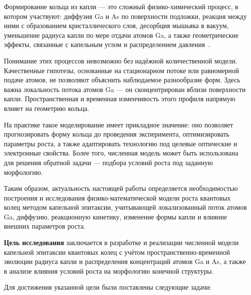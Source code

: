\documentclass[14pt,oneside]{extarticle}
\begin{document}
Формирование кольца из капли — это сложный физико-химический процесс, в котором участвуют: диффузия Ga и As по поверхности подложки, реакция между ними с образованием кристаллического слоя, десорбция мышьяка в вакуум, уменьшение радиуса капли по мере отдачи атомов Ga, а также геометрические эффекты, связанные с капельным углом и распределением давления~\cite{Li2009, 2008GrowthMechanisms}.

Понимание этих процессов невозможно без надёжной количественной модели. Качественные гипотезы, основанные на стационарном потоке или равномерной подаче атомов, не позволяют объяснить наблюдаемое разнообразие форм. Здесь важна локальность потока атомов Ga — он сконцентрирован вблизи поверхности капли. Пространственная и временная изменчивость этого профиля напрямую влияет на геометрию кольца.

На практике такое моделирование имеет прикладное значение: оно позволяет прогнозировать форму кольца до проведения эксперимента, оптимизировать параметры роста, а также адаптировать технологию под целевые оптические и электронные свойства. Более того, численная модель может быть использована для решения обратной задачи — подбора условий роста под заданную морфологию.

Таким образом, актуальность настоящей работы определяется необходимостью построения и исследования физико-математической модели роста квантовых колец методом капельной эпитаксии, учитывающей локализованный поток атомов Ga, диффузию, реакционную кинетику, изменение формы капли и влияние внешних параметров роста.


\textbf{Цель исследования} заключается в разработке и реализации численной модели капельной эпитаксии квантовых колец с учётом пространственно-временной эволюции радиуса капли и распределения концентраций атомов Ga и As, а также в анализе влияния условий роста на морфологию конечной структуры.

Для достижения указанной цели были поставлены следующие задачи:
\end{document}
